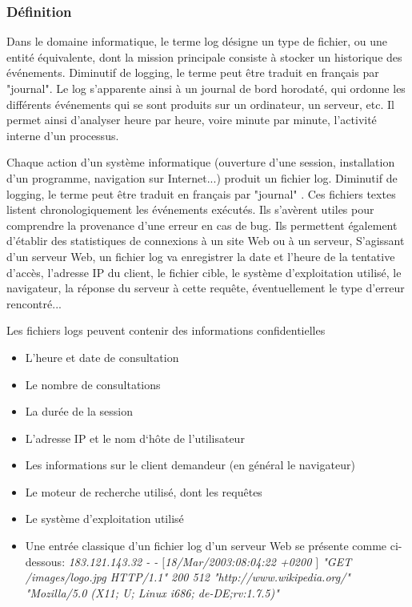 \subsubsection{Définition}
Dans le domaine informatique, le terme log désigne un type de fichier, ou une entité équivalente, dont la mission principale consiste
à stocker un historique des événements. Diminutif de logging, le terme peut être traduit en français par "journal".
Le log s'apparente ainsi à un journal de bord horodaté, qui ordonne les différents événements qui se sont produits sur un ordinateur,
 un serveur, etc. Il permet ainsi d'analyser heure par heure, voire minute par minute, l'activité interne d'un processus.


Chaque action d'un système informatique (ouverture d'une session, installation d'un programme, navigation sur Internet...) produit
un fichier log. Diminutif de logging, le terme peut être traduit en français par "journal" . Ces fichiers textes listent
chronologiquement les événements exécutés. Ils s'avèrent utiles pour comprendre la provenance d'une erreur en cas de bug.
Ils permettent également d'établir des statistiques de connexions à un site Web ou à un serveur,
S'agissant d'un serveur Web, un fichier log va enregistrer la date et l'heure de la tentative d'accès, l'adresse IP du client,
le fichier cible, le système d'exploitation utilisé, le navigateur, la réponse du serveur à cette requête, éventuellement le type
 d'erreur rencontré...

Les fichiers logs peuvent contenir des informations confidentielles

\begin{itemize}
	\item L’heure et date de consultation
	\item Le nombre de consultations
	\item La durée de la session
	\item L’adresse IP et le nom d‘hôte de l’utilisateur
	\item Les informations sur le client demandeur (en général le navigateur)
	\item Le moteur de recherche utilisé, dont les requêtes
	\item Le système d’exploitation utilisé
	\item Une entrée classique d’un fichier log d’un serveur Web se présente comme ci-dessous: \textit{183.121.143.32 - - $ [ $18/Mar/2003:08:04:22 +0200 $ ] $ "GET /images/logo.jpg HTTP/1.1" 200 512 "http://www.wikipedia.org/" "Mozilla/5.0 (X11; U; Linux i686; de-DE;rv:1.7.5)"}
\end{itemize}

